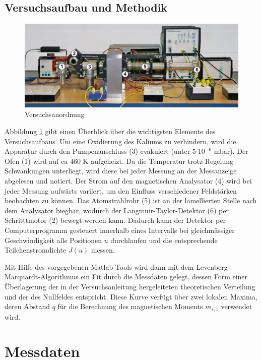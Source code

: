 \documentclass[a4paper,parskip,11pt, DIV12]{scrreprt}
\begin{document}
\section{Versuchsaufbau und Methodik}
	\begin{figure}[H]
\centering
\includegraphics[keepaspectratio,width=\textwidth,height=\textheight]{Setup}
\caption[Setup]{Versuchsanordnung}
\label{Abb:Setup}
\end{figure}
Abbildung \ref{Abb:Setup} gibt einen Überblick über die wichtigsten Elemente des Versuchsaufbaus. Um eine Oxidierung des Kaliums zu verhindern, wird die Apparatur durch den Pumpenanschluss (3) evakuiert (unter 5$\cdot$10$^{-6}$ mbar). Der Ofen (1) wird auf ca 460 K aufgeheizt. Da die Temperatur trotz Regelung Schwankungen unterliegt, wird diese bei jeder Messung an der Messanzeige abgelesen und notiert. Der Strom auf den magnetischen Analysator (4) wird bei jeder Messung aufwärts variiert, um den Einfluss verschiedener Feldstärken beobachten zu können. Das Atomstrahlrohr (5) ist an der lamellierten Stelle nach dem Analysator biegbar, wodurch der Langmuir-Taylor-Detektor (6) per Schritttmotor (2) bewegt werden kann. Dadurch kann der Detektor per Computerprogramm gesteuert innerhalb eines Intervalls bei gleichmässiger Geschwindigkeit alle Positionen $u$ durchlaufen und die entsprechende Teilchenstromdichte $J(u)$ messen. 

	Mit Hilfe des vorgegebenen Matlab-Tools wird dann mit dem Levenberg-Marquardt-Algorithmus ein Fit durch die Messdaten gelegt, dessen Form einer Überlagerung der in der Versuchsanleitung hergeleiteten theoretischen Verteilung und der des Nullfeldes entspricht. Diese Kurve verfügt über zwei lokalen Maxima, deren Abstand $q$ für die Berechnung des magnetischen Moments $m_{s,z}$ verwendet wird.

\clearpage

\chapter{Messdaten}
\end{document}
